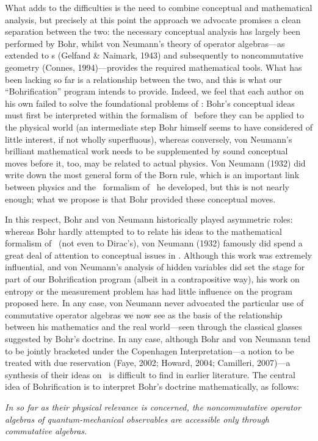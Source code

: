 \documentclass[12pt]{article}
\begin{document}
What adds to the difficulties is the need to combine conceptual and mathematical analysis, but precisely at this point the approach we advocate promises a clean separation between the two:  the necessary conceptual analysis has largely been performed by Bohr,  whilst von Neumann's theory of operator algebras---as extended to \ca s (Gelfand \& Naimark, 1943) and subsequently to
noncommutative geometry (Connes, 1994)---provides the required mathematical tools. What has been lacking so far is a relationship between the two, and this is what our ``Bohrification'' program intends to provide. Indeed, we feel that 
 each author  on his own failed to solve the foundational problems of \qm:  Bohr's  conceptual ideas must first be interpreted within the formalism of \qm\ before they can be applied to the physical world (an intermediate step Bohr himself seems to have considered of little interest, if not wholly superfluous), whereas conversely, von Neumann's brilliant mathematical work needs to be supplemented by sound conceptual moves before it, too, may be related to actual physics. Von Neumann (1932) did write down the most general form of the Born rule, which is an important link between physics and the  \Hs\  formalism of \qm\ he developed, but this is not nearly enough;  what we propose is that Bohr provided these conceptual moves.
 
In this respect, Bohr and von Neumann historically played asymmetric roles: whereas Bohr hardly attempted to to relate his ideas to the mathematical formalism of \qm\ (not even to Dirac's),  von Neumann (1932) famously did spend a great deal of attention to conceptual issues in \qm. Although this work  was extremely influential, and von Neumann's  analysis of  hidden variables did set the stage for part of our Bohrification program (albeit in a contrapositive way), his work on entropy or the measurement problem has had little influence on the program proposed here.  
 In any case,  von Neumann never advocated the particular use of commutative  operator algebras we now see as the basis of the relationship between his mathematics and the real world---seen through the classical glasses suggested  by Bohr's doctrine. 
 In any case, although  Bohr and von Neumann tend to be jointly bracketed  under the Copenhagen Interpretation---a notion to be treated with due reservation (Faye, 2002; Howard, 2004; Camilleri, 2007)---a synthesis of their ideas on \qm\ is difficult to find in earlier literature.
The central idea of Bohrification is to interpret Bohr's  doctrine mathematically, as follows: 
\begin{trivlist}
\item[] \emph{In so far as their physical relevance is concerned, the noncommutative operator algebras of quantum-mechanical observables are accessible only through commutative algebras.}
\end{trivlist}
\end{document}
